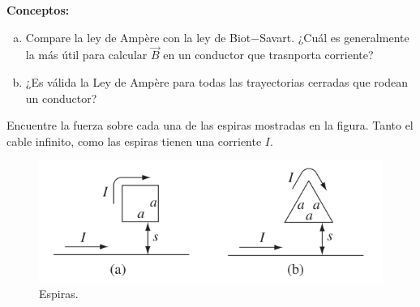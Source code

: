 \begin{mdframed}[style=warning]
	\begin{ejercicio}
		\textbf{Conceptos: }
		\begin{enumerate}[a)]
			\item Compare la ley de Ampère con la ley de Biot$-$Savart. ¿Cuál es generalmente la más útil para calcular $\vec{B}$ en un conductor que trasnporta corriente?
			\item ¿Es válida la Ley de Ampère para todas las trayectorias cerradas que rodean un conductor?
		\end{enumerate}
	\end{ejercicio}
\end{mdframed}











\begin{mdframed}[style=warning]
	\begin{ejercicio}
		Encuentre la fuerza sobre cada una de las espiras mostradas en la figura. Tanto el cable infinito, como las espiras tienen una corriente $I$.
		\begin{figure}[H]
			\centering
			\includegraphics[scale=0.5]{./img/p1.png}
			\caption{Espiras.}
			\label{espiras}	
		\end{figure}
	\end{ejercicio}
\end{mdframed}



















